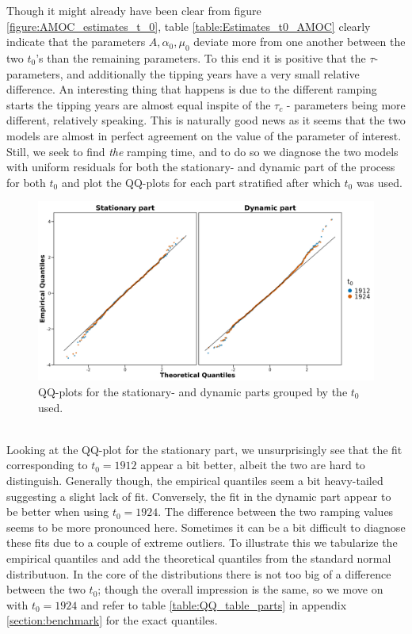 Though it might already have been clear from figure \ref{figure:AMOC_estimates_t_0}, table \ref{table:Estimates_t0_AMOC} clearly indicate that the parameters $A, \alpha_0, \mu_0$ deviate more from one another between the two $t_0$'s than the remaining parameters. To this end it is positive that the $\tau$-parameters, and additionally the tipping years have a very small relative difference. An interesting thing that happens is due to the different ramping starts the tipping years are almost equal inspite of the $\tau_c$ - parameters being more different, relatively speaking. This is naturally good news as it seems that the two models are almost in perfect agreement on the value of the parameter of interest. Still, we seek to find \textit{the} ramping time, and to do so we diagnose the two models with uniform residuals for both the stationary- and dynamic part of the process for both $t_0$ and plot the QQ-plots for each part stratified after which $t_0$ was used.
\begin{figure}[h!]
    \begin{center}
        \includegraphics[scale = .09]{figures/QQ_plot_parts.jpeg}
        \caption{QQ-plots for the stationary- and dynamic parts grouped by the $t_0$ used.}
        \label{figure:AMOC_QQ_t_0}
    \end{center}
\end{figure}\\
Looking at the QQ-plot for the stationary part, we unsurprisingly see that the fit corresponding to $t_0 = 1912$ appear a bit better, albeit the two are hard to distinguish. Generally though, the empirical quantiles seem a bit heavy-tailed suggesting a slight lack of fit. Conversely, the fit in the dynamic part appear to be better when using $t_0 = 1924$. The difference between the two ramping values seems to be more pronounced here. Sometimes it can be a bit difficult to diagnose these fits due to a couple of extreme outliers. To illustrate this we tabularize the empirical quantiles and add the theoretical quantiles from the standard normal distributuon. In the core of the distributions there is not too big of a difference between the two $t_0$; though the overall impression is the same, so we move on with $t_0 = 1924$ and refer to table \ref{table:QQ_table_parts} in appendix \ref{section:benchmark} for the exact quantiles.\newpage 
